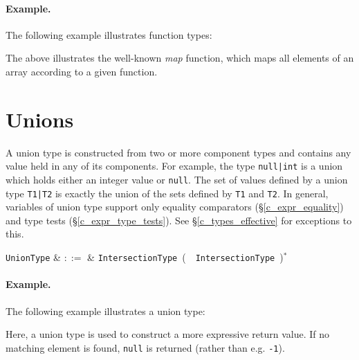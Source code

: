 \paragraph{Example.} The following example illustrates function types:



The above illustrates the well-known {\em map} function, which maps all elements of an array according to a given function.


\section{Unions}
\label{c_types_unions}

A union type is constructed from two or more component types and contains any value held in any of its components.  For example, the type \lstinline{null|int} is a union which holds either an integer value or \lstinline{null}.  The set of values defined by a union type \lstinline{T1|T2} is exactly the union of the sets defined by \lstinline{T1} and \lstinline{T2}.  In general, variables of union type support only equality comparators (\S\ref{c_expr_equality}) and type tests (\S\ref{c_expr_type_tests}).  See \S\ref{c_types_effective} for exceptions to this.

\begin{syntax}
  \verb+UnionType+ & $::=$ & \verb+IntersectionType+\ \big(\ \token{|}\ \verb+IntersectionType+\
  \big)$^*$\\
\end{syntax}

\paragraph{Example.} The following example illustrates a union type:



Here, a union type is used to construct a more expressive return value.  If no matching element is found, \lstinline{null} is returned (rather than e.g. \lstinline{-1}).


